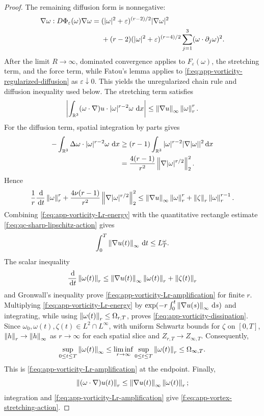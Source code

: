 \begin{proof}
The remaining diffusion form is nonnegative:
\begin{align}
 \nabla\omega:D\Phi_\varepsilon(\omega)\nabla\omega
 ={}&(|\omega|^2+\varepsilon)^{(r-2)/2}|\nabla\omega|^2
 \notag\\
 &+(r-2)(|\omega|^2+\varepsilon)^{(r-4)/2}
 \sum_{j=1}^3(\omega\cdot\partial_j\omega)^2.
 \label{f:eq:app-vorticity-regularized-diffusion}
\end{align}
After the limit \(R\to\infty\), dominated convergence applies to
\(F_\varepsilon(\omega)\), the stretching term, and the force term, while Fatou's lemma
applies to \eqref{f:eq:app-vorticity-regularized-diffusion} as
\(\varepsilon\downarrow0\).  This yields the unregularized chain rule and
diffusion inequality used below.  The stretching term
satisfies
\[
 \left|\int_{\mathbb R^3}(\omega\cdot\nabla)u\cdot
       |\omega|^{r-2}\omega\,\,\mathrm d x\right|
 \le\left\lVert \nabla u\right\rVert_\infty\left\lVert \omega\right\rVert_r^r.
\]
For the diffusion term, spatial integration by parts gives
\begin{align*}
 -\int_{\mathbb R^3}\Delta\omega\cdot|\omega|^{r-2}\omega\,\,\mathrm d x
 &\ge(r-1)\int_{\mathbb R^3}|\omega|^{r-2}|\nabla|\omega||^2\,\mathrm d x\\
 &=\frac{4(r-1)}{r^2}
   \left\lVert \nabla|\omega|^{r/2}\right\rVert_2^2.
\end{align*}
Hence
\begin{equation}
 \frac1r\frac{\,\mathrm d}{\,\mathrm d t}\left\lVert \omega\right\rVert_r^r
 +\frac{4\nu(r-1)}{r^2}
   \left\lVert \nabla|\omega|^{r/2}\right\rVert_2^2
 \le\left\lVert \nabla u\right\rVert_\infty\left\lVert \omega\right\rVert_r^r
 +\left\lVert \zeta\right\rVert_r\left\lVert \omega\right\rVert_r^{r-1}.
 \label{f:eq:app-vorticity-Lr-energy}
\end{equation}
Combining \eqref{f:eq:app-vorticity-Lr-energy} with the quantitative rectangle
estimate \eqref{f:eq:qc-sharp-lipschitz-action} gives
\[
 \int_0^T\left\lVert \nabla u(t)\right\rVert_\infty\,\mathrm d t\le L_T^\omega.
\]
The scalar inequality
\[
 \frac{\,\mathrm d}{\,\mathrm d t}\left\lVert \omega(t)\right\rVert_r
 \le\left\lVert \nabla u(t)\right\rVert_\infty\left\lVert \omega(t)\right\rVert_r+\left\lVert \zeta(t)\right\rVert_r
\]
and Gronwall's inequality prove
\eqref{f:eq:app-vorticity-Lr-amplification} for finite \(r\).  Multiplying
\eqref{f:eq:app-vorticity-Lr-energy} by
\(
 \exp(-r\int_0^t\left\lVert \nabla u(s)\right\rVert_\infty\,\mathrm d s)
\)
and integrating, while using
\(\left\lVert \omega(t)\right\rVert_r\le\Omega_{r,T}\), proves
\eqref{f:eq:app-vorticity-dissipation}.  Since
\(\omega_0,\omega(t),\zeta(t)\in L^2\cap L^\infty\), with uniform
Schwartz bounds for \(\zeta\) on \([0,T]\),
\(\left\lVert h\right\rVert_r\to\left\lVert h\right\rVert_\infty\) as \(r\to\infty\) for each spatial slice
and \(Z_{r,T}\to Z_{\infty,T}\).
Consequently,
\[
 \sup_{0\le t\le T}\left\lVert \omega(t)\right\rVert_\infty
 \le\liminf_{r\to\infty}
      \sup_{0\le t\le T}\left\lVert \omega(t)\right\rVert_r
 \le\Omega_{\infty,T}.
\]
This is \eqref{f:eq:app-vorticity-Lr-amplification} at the endpoint.  Finally,
\[
 \left\lVert (\omega\cdot\nabla)u(t)\right\rVert_r
 \le\left\lVert \nabla u(t)\right\rVert_\infty\left\lVert \omega(t)\right\rVert_r;
\]
integration and \eqref{f:eq:app-vorticity-Lr-amplification} give
\eqref{f:eq:app-vortex-stretching-action}.
\end{proof}

